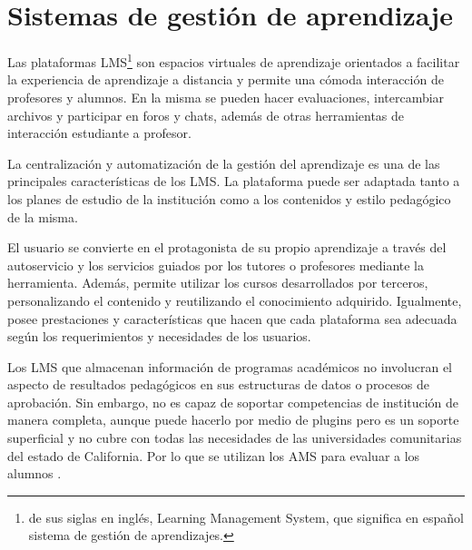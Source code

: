 \section{Sistemas de gestión de aprendizaje}
Las plataformas LMS\footnote{de sus siglas en inglés, Learning Management System, que significa en español sistema de gestión de aprendizajes.} son espacios virtuales de aprendizaje orientados a facilitar la experiencia de aprendizaje a distancia y permite una cómoda interacción de profesores y alumnos. En la misma se pueden hacer evaluaciones, intercambiar archivos y participar en foros y chats, además de otras herramientas de interacción estudiante a profesor.

La centralización y automatización de la gestión del aprendizaje es una de las principales características de los LMS. La plataforma puede ser adaptada tanto a los planes de estudio de la institución como a los contenidos y estilo pedagógico de la misma.

El usuario se convierte en el protagonista de su propio aprendizaje a través del autoservicio y los servicios guiados por los tutores o profesores mediante la herramienta. Además, permite utilizar los cursos desarrollados por terceros, personalizando el contenido y reutilizando el conocimiento adquirido. Igualmente, posee prestaciones y características que hacen que cada plataforma sea adecuada según los requerimientos y necesidades de los usuarios.

Los LMS que almacenan información de programas académicos no involucran el aspecto de resultados pedagógicos en sus estructuras de datos o procesos de aprobación. Sin embargo, no es capaz de soportar competencias de institución de manera completa, aunque puede hacerlo por medio de plugins pero es un soporte superficial y no cubre con todas las necesidades de las universidades comunitarias del estado de California. Por lo que se utilizan los AMS para evaluar a los alumnos \citep{aalst_workflow_2004}.